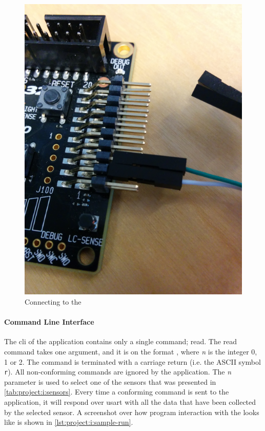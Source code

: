 \begin{figure}[ht]
  \begin{center}
    \includegraphics[scale=0.3]{figures/project-i-connect.png}
  \end{center}
  \caption{Connecting to the {\STK}}
  \label{fig:project:i:connect}
\end{figure}


\paragraph{Command Line Interface}

The \gls{cli} of the application contains only a single command; read.
The read command takes one argument, and it is on the format , where \emph{n} is the integer 0, 1 or 2.
The command is terminated with a carriage return (i.e. the ASCII symbol \texttt{{}r}).
All non-conforming commands are ignored by the application.
The \emph{n} parameter is used to select one of the sensors that was presented in \autoref{tab:project:i:sensors}.
Every time a conforming command is sent to the application, it will respond over \gls{usart} with all the data that have been collected by the selected sensor.
A screenshot over how program interaction with the {\tracker} looks like is shown in \autoref{lst:project:i:sample-run}.

